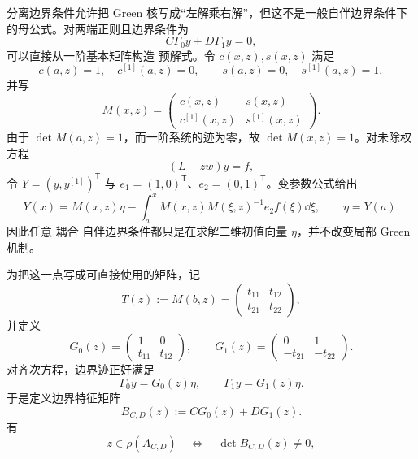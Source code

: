 分离边界条件允许把 Green 核写成“左解乘右解”，但这不是一般自伴边界条件下的母公式。对两端正则且边界条件为
\[
 C\Gamma_0y+D\Gamma_1y=0,
\]
可以直接从一阶基本矩阵构造 预解式。令 $c(x,z),s(x,z)$ 满足
\[
 c(a,z)=1,\quad c^{[1]}(a,z)=0,
 \qquad
 s(a,z)=0,\quad s^{[1]}(a,z)=1,
\]
并写
\begin{equation}\label{eq:math-sl-fundamental-matrix}
 M(x,z)=
 \begin{pmatrix}
 c(x,z)&s(x,z)\\
 c^{[1]}(x,z)&s^{[1]}(x,z)
 \end{pmatrix}.
\end{equation}
由于 $\det M(a,z)=1$，而一阶系统的迹为零，故 $\det M(x,z)=1$。对未除权方程
\[
 (L-zw)y=f,
\]
令 $Y=(y,y^{[1]})^{\mathsf T}$ 与 $e_1=(1,0)^{\mathsf T}$、$e_2=(0,1)^{\mathsf T}$。变参数公式给出
\begin{equation}\label{eq:math-sl-variation-matrix}
 Y(x)=M(x,z)\eta
 -\int_a^x M(x,z)M(\xi,z)^{-1}e_2 f(\xi)\dd\xi,
 \qquad \eta=Y(a).
\end{equation}
因此任意 耦合 自伴边界条件都只是在求解二维初值向量 $\eta$，并不改变局部 Green 机制。

为把这一点写成可直接使用的矩阵，记
\[
 T(z):=M(b,z)=
 \begin{pmatrix}t_{11}&t_{12}\\t_{21}&t_{22}\end{pmatrix},
\]
并定义
\[
 G_0(z)=
 \begin{pmatrix}1&0\\ t_{11}&t_{12}\end{pmatrix},
 \qquad
 G_1(z)=
 \begin{pmatrix}0&1\\-t_{21}&-t_{22}\end{pmatrix}.
\]
对齐次方程，边界迹正好满足
\[
 \Gamma_0y=G_0(z)\eta,
 \qquad
 \Gamma_1y=G_1(z)\eta.
\]
于是定义边界特征矩阵
\begin{equation*}B_{C,D}(z):=C G_0(z)+D G_1(z).
\end{equation*}
有
\begin{equation}\label{eq:math-sl-boundary-det-spectrum}
 z\in\rho(A_{C,D})
 \quad\Longleftrightarrow\quad
 \det B_{C,D}(z)\neq0,
\end{equation}

